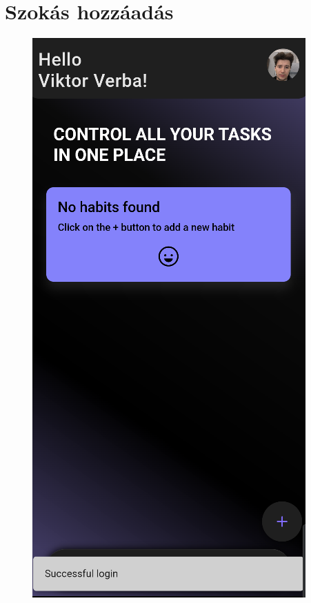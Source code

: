 \documentclass[12pt]{report}
\begin{document}
\section{Szokás hozzáadás}
\begin{figure}[H]
    \centering

    \begin{minipage}[b]{0.25\textwidth}
        \centering
        \includegraphics[width=\linewidth]{src/habit1.png}

\end{minipage}
\end{figure}
\end{document}
